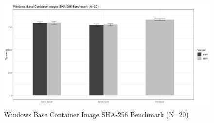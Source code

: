 \begin{figure}[h]
	\captionsetup{width=0.8\linewidth}
	\includegraphics[width=0.9\linewidth]{img/SHA_20.png}
	\centering
	\caption{Windows Base Container Image SHA-256 Benchmark (N=20)}
	\label{fig:SHA_20}
\end{figure}
